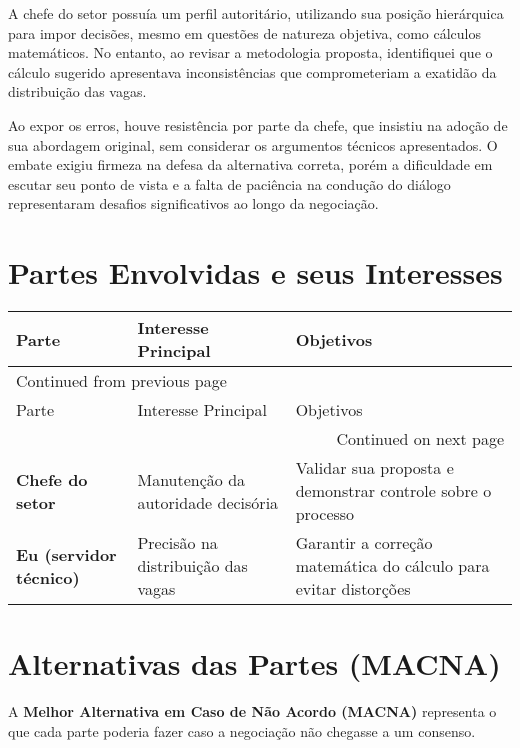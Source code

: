 \documentclass[11pt]{article}
\begin{document}
A chefe do setor possuía um perfil autoritário, utilizando sua posição hierárquica para impor decisões, mesmo em questões de natureza objetiva, como cálculos matemáticos. No entanto, ao revisar a metodologia proposta, identifiquei que o cálculo sugerido apresentava inconsistências que comprometeriam a exatidão da distribuição das vagas.

Ao expor os erros, houve resistência por parte da chefe, que insistiu na adoção de sua abordagem original, sem considerar os argumentos técnicos apresentados. O embate exigiu firmeza na defesa da alternativa correta, porém a dificuldade em escutar seu ponto de vista e a falta de paciência na condução do diálogo representaram desafios significativos ao longo da negociação.
\section*{Partes Envolvidas e seus Interesses}
\label{sec:orgf9dc376}
\begin{longtable}{l p{} p{}}
Parte & Interesse Principal & Objetivos\\
\hline
\endfirsthead
\multicolumn{3}{l}{Continued from previous page} \\
\hline

Parte & Interesse Principal & Objetivos \\

\hline
\endhead
\hline\multicolumn{3}{r}{Continued on next page} \\
\endfoot
\endlastfoot
\hline
\textbf{Chefe do setor} & Manutenção da autoridade decisória & Validar sua proposta e demonstrar controle sobre o processo\\
\hline
\textbf{Eu (servidor técnico)} & Precisão na distribuição das vagas & Garantir a correção matemática do cálculo para evitar distorções\\
\end{longtable}
\section*{Alternativas das Partes (MACNA)}
\label{sec:orgdd45819}
A \textbf{Melhor Alternativa em Caso de Não Acordo (MACNA)} representa o que cada parte poderia fazer caso a negociação não chegasse a um consenso.
\end{document}
